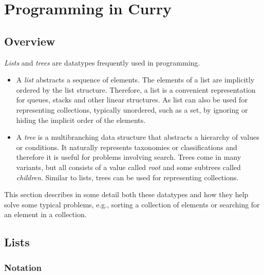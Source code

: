 \chapter{Programming in Curry}

\section{Overview}

\emph{Lists} and \emph{trees}
are datatypes frequently used in programming.

\begin{itemize}
\item{} 
A \emph{list} abstracts a sequence of elements.
The elements of a list are implicitly ordered by the list structure.
Therefore, a list is a convenient representation for queues, stacks
and other linear structures.
As list can also be used for representing collections, typically
unordered, such as a set, by ignoring or hiding the implicit
order of the elements.
\item{} 
A \emph{tree} is a multibranching
data structure that abstracts a hierarchy of values or conditions.
It naturally represents taxonomies or classifications and
therefore it is useful for problems involving search.
Trees come in many variants, but all consists of a value
called \emph{root} and some subtrees called
\emph{children}.
Similar to lists, trees can be used for representing collections.
\end{itemize}
%
This section describes in some detail both these datatypes and how
they help solve some typical problems, e.g., sorting a
collection of elements or searching for an element in a collection.

\section{Lists}

\subsection{Notation}

